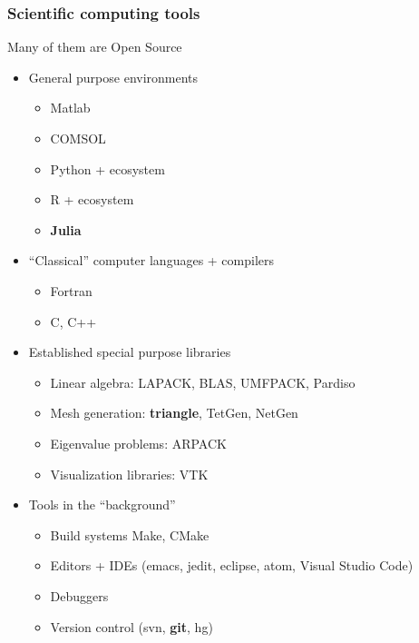\begin{frame}\frametitle{Scientific computing tools}

  Many of them are Open Source

  \begin{itemize}
    \tightlist
  \item
    General purpose environments

    \begin{itemize}
      \tightlist
    \item
      Matlab
    \item
      COMSOL
    \item
      Python + ecosystem
    \item
      R + ecosystem
    \item
      \textbf{Julia}
    \end{itemize}
  \item
    ``Classical'' computer languages + compilers

    \begin{itemize}
      \tightlist
    \item
      Fortran
    \item
      C, C++
    \end{itemize}
  \item
    Established special purpose libraries

    \begin{itemize}
      \tightlist
    \item
      Linear algebra: LAPACK, BLAS, UMFPACK, Pardiso
    \item
      Mesh generation: \textbf{triangle}, TetGen, NetGen
    \item
      Eigenvalue problems: ARPACK
    \item
      Visualization libraries: VTK
    \end{itemize}
  \item
    Tools in the ``background''

    \begin{itemize}
      \tightlist
    \item
      Build systems Make, CMake
    \item
      Editors + IDEs (emacs, jedit, eclipse, atom, Visual Studio Code)
    \item
      Debuggers
    \item
      Version control (svn, \textbf{git}, hg)
    \end{itemize}
  \end{itemize}

\end{frame}

